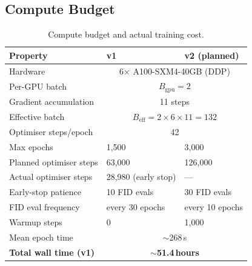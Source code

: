 \subsection{Compute Budget}

\begin{table}[ht]
\centering
\caption{Compute budget and actual training cost.}
\label{tab:compute}
\begin{tabular}{lll}
\toprule
\textbf{Property} & \textbf{v1} & \textbf{v2 (planned)} \\
\midrule
Hardware                   & \multicolumn{2}{c}{6$\times$ A100-SXM4-40GB (DDP)} \\
Per-GPU batch              & \multicolumn{2}{c}{$B_\mathrm{gpu} = 2$} \\
Gradient accumulation      & \multicolumn{2}{c}{11 steps} \\
Effective batch            & \multicolumn{2}{c}{$B_\mathrm{eff} = 2 \times 6 \times 11 = 132$} \\
Optimiser steps/epoch      & \multicolumn{2}{c}{42} \\
Max epochs                 & 1{,}500     & 3{,}000 \\
Planned optimiser steps    & 63{,}000    & 126{,}000 \\
Actual optimiser steps     & 28{,}980 (early stop) & --- \\
Early-stop patience        & 10 FID evals & 30 FID evals \\
FID eval frequency         & every 30 epochs & every 10 epochs \\
Warmup steps               & 0            & 1{,}000 \\
Mean epoch time            & \multicolumn{2}{c}{${\sim}$268\,s} \\
\textbf{Total wall time (v1)}   & \multicolumn{2}{c}{\textbf{${\sim}$51.4\,hours}} \\
\bottomrule
\end{tabular}
\end{table}
